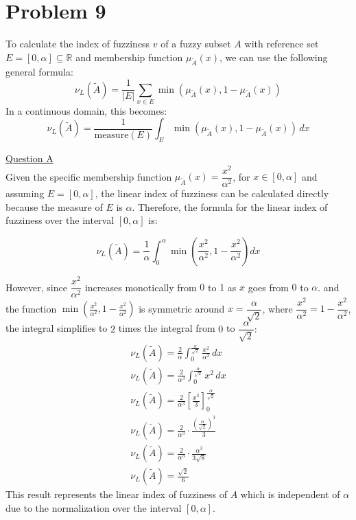 \section{Problem 9}
To calculate the index of fuzziness $v$ of a fuzzy subset $A$ with reference set $E = [0, \alpha] \subseteq \mathbb{R}$ and membership function $\mu_{\tilde{A}}(x)$, we can use the following general formula:
\begin{equation}
	\nu_L(\tilde{A}) = \frac{1}{|E|} \sum_{x \in E} \min(\mu_{\tilde{A}}(x), 1 - \mu_{\tilde{A}}(x))
\end{equation}
In a continuous domain, this becomes:
\begin{equation}
	\nu_L(\tilde{A}) = \frac{1}{\text{measure}(E)} \int_{E} \min(\mu_{\tilde{A}}(x), 1 - \mu_{\tilde{A}}(x)) \, dx
\end{equation}

\underline{Question A}\\
Given the specific membership function $\mu_{\tilde{A}}(x) = \dfrac{x^2}{\alpha^2}$, for $x \in [0, \alpha]$ and assuming $E = [0, \alpha]$, the linear index of fuzziness can be calculated directly because the measure of $E$ is $\alpha$. Therefore, the formula for the linear index of fuzziness over the interval 
$[0,\alpha]$ is:

\begin{equation}
	\nu_L(\tilde{A}) = \dfrac{1}{\alpha} \int_{0}^{\alpha} \min\left( \dfrac{x^2}{\alpha^2}, 1 - \dfrac{x^2}{\alpha^2} \right) dx
\end{equation}

However, since $\dfrac{x^2}{\alpha^2}$ increases monotically from $0$ to $1$ as $x$ goes from $0$ to $\alpha$. and the function $\min\left(\frac{x^2}{\alpha^2}, 1 - \frac{x^2}{\alpha^2}\right)
$ is symmetric around $x = \dfrac{\alpha}{\sqrt{2}}$, where $\dfrac{x^2}{\alpha^2} = 1 - \dfrac{x^2}{\alpha^2}$, the integral simplifies to $2$ times the integral from $0$ to $\dfrac{\alpha}{\sqrt{2}}:$
\\
\begin{gather*}
	\nu_L(\tilde{A}) = \frac{2}{\alpha} \int_{0}^{\frac{\alpha}{\sqrt{2}}} \frac{x^2}{\alpha^2} \, dx \\
	\nu_L(\tilde{A}) = \frac{2}{\alpha^3} \int_{0}^{\frac{\alpha}{\sqrt{2}}} x^2 \, dx\\
	\nu_L(\tilde{A}) = \frac{2}{\alpha^3} \left[ \frac{x^3}{3} \right]_{0}^{\frac{\alpha}{\sqrt{2}}} \\
	\nu_L(\tilde{A}) = \frac{2}{\alpha^3} \cdot \frac{\left(\frac{\alpha}{\sqrt{2}}\right)^3}{3}\\
	\nu_L(\tilde{A}) = \frac{2}{\alpha^3} \cdot \frac{\alpha^3}{3\sqrt{8}} \\
	\nu_L(\tilde{A}) = \frac{\sqrt{2}}{6}
\end{gather*}
This result represents the linear index of fuzziness of $A$ which is independent of $\alpha$ due to the normalization over the interval $[0,\alpha]$.
\vspace{5mm}

